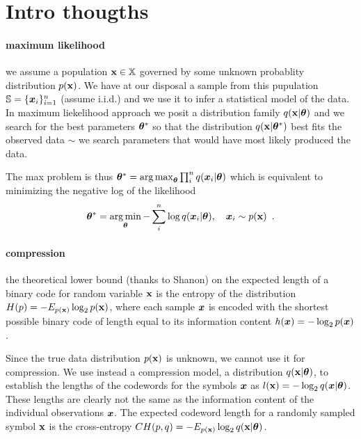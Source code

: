 \clearpage

\section{Intro thougths}\label{sec:thoughts}

\paragraph{maximum likelihood}
we assume a population ${\mathbf{x}} \in {\mathbb{X}}$ governed by some unknown probablity distribution $p({\mathbf{x}})$.
We have at our disposal a sample from this pupulation ${\mathbb{S}} = \{{\bm{x}}_i\}_{i=1}^n$ (assume i.i.d.) and we use it to infer a statistical model of the data.
In maximum liekelihood approach we posit a distribution family $q({\mathbf{x}} | {\bm{\theta}})$ and we search for the best parameters ${\bm{\theta}}^*$ so that the distribution $q({\mathbf{x}} | {\bm{\theta}}^*)$ best fits the observed data $\sim$ we search parameters that would have most likely produced the data.

The max  problem is thus
${\bm{\theta}}^* = \operatorname*{arg\,max}_{\bm{\theta}} \prod_i^n q({\bm{x}}_i | {\bm{\theta}})$
which is equivalent to minimizing the negative log of the likelihood
\begin{align}\label{fig:thoughts_nnl}
{\bm{\theta}}^* = \operatorname*{arg\,min}_{\bm{\theta}} - \sum_i^n \log q({\bm{x}}_i | {\bm{\theta}}), \quad {\bm{x}}_i \sim p({\mathbf{x}}) \enspace .
\end{align}


\paragraph{compression} the theoretical lower bound (thanks to Shanon) on the expected length of a binary code for random variable ${\mathbf{x}}$ is the entropy of the distribution $H(p) = - E_{p({\mathbf{x}})} \log_2 p({\mathbf{x}})$, where each sample ${\bm{x}}$ is encoded with the shortest possible binary code of length equal to its information content $h({\bm{x}}) = - \log_2 p({\bm{x}})$.

Since the true data distribution $p({\mathbf{x}})$ is unknown, we cannot use it for compression.
We use instead a compression model, a distribution $q({\mathbf{x}} | {\bm{\theta}})$, to establish the lengths of the codewords for the symbols ${\bm{x}}$ as $l({\mathbf{x}}) = - \log_2 q({\bm{x}} | {\bm{\theta}})$.
These lengths are clearly not the same as the information content of the individual observations ${\bm{x}}$.
The expected codeword length for a randomly sampled symbol ${\mathbf{x}}$ is the cross-entropy $CH(p, q) = - E_{p({\mathbf{x}})} \log_2 q({\mathbf{x}} | {\bm{\theta}})$.

